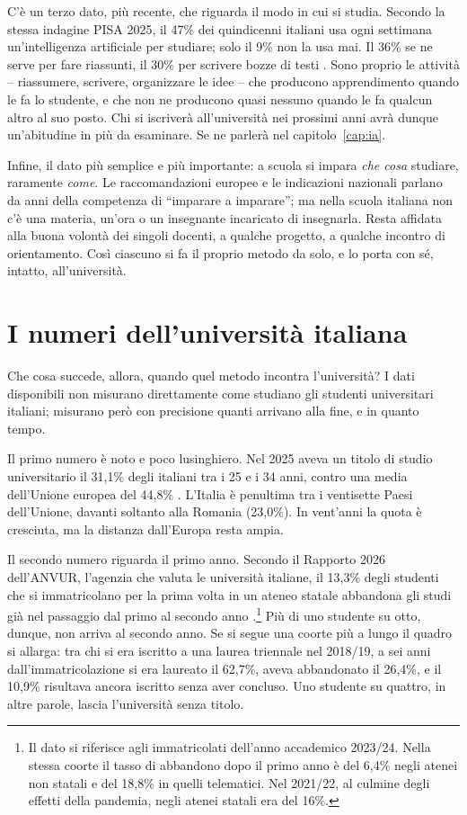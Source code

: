 C'è un terzo dato, più recente, che riguarda il modo in cui si studia.
Secondo la stessa indagine PISA 2025, il 47\% dei quindicenni italiani
usa ogni settimana un'intelligenza artificiale per studiare; solo il 9\%
non la usa mai. Il 36\% se ne serve per fare riassunti, il 30\% per
scrivere bozze di testi \parencite{oecd2026pisa}. Sono proprio le
attività -- riassumere, scrivere, organizzare le idee -- che producono
apprendimento quando le fa lo studente, e che non ne producono quasi
nessuno quando le fa qualcun altro al suo posto. Chi si iscriverà
all'università nei prossimi anni avrà dunque un'abitudine in più da
esaminare. Se ne parlerà nel capitolo~\ref{cap:ia}.

Infine, il dato più semplice e più importante: a scuola si impara
\emph{che cosa} studiare, raramente \emph{come}. Le raccomandazioni
europee e le indicazioni nazionali parlano da anni della competenza di
\enquote{imparare a imparare}; ma nella scuola italiana non c'è una
materia, un'ora o un insegnante incaricato di insegnarla. Resta affidata
alla buona volontà dei singoli docenti, a qualche progetto, a qualche
incontro di orientamento. Così ciascuno si fa il proprio metodo da solo,
e lo porta con sé, intatto, all'università.

\section{I numeri dell'università italiana}

Che cosa succede, allora, quando quel metodo incontra l'università?
I dati disponibili non misurano direttamente come studiano gli studenti
universitari italiani; misurano però con precisione quanti arrivano alla
fine, e in quanto tempo.

Il primo numero è noto e poco lusinghiero. Nel 2025 aveva un titolo
di studio universitario il 31,1\% degli italiani tra i 25 e i 34 anni,
contro una media dell'Unione europea del 44,8\%
\parencite{eurostat2026}. L'Italia è penultima tra i ventisette Paesi
dell'Unione, davanti soltanto alla Romania (23,0\%). In vent'anni la
quota è cresciuta, ma la distanza dall'Europa resta ampia.

Il secondo numero riguarda il primo anno. Secondo il Rapporto 2026
dell'ANVUR, l'agenzia che valuta le università italiane, il 13,3\% degli
studenti che si immatricolano per la prima volta in un ateneo statale
abbandona gli studi già nel passaggio dal primo al secondo anno
\parencite{anvur2026}.\footnote{Il dato si riferisce agli immatricolati
dell'anno accademico 2023/24. Nella stessa coorte il tasso di abbandono
dopo il primo anno è del 6,4\% negli atenei non statali e del 18,8\% in
quelli telematici. Nel 2021/22, al culmine degli effetti della
pandemia, negli atenei statali era del 16\%.} Più di uno studente su
otto, dunque, non arriva al secondo anno. Se si segue una coorte più a
lungo il quadro si allarga: tra chi si era iscritto a una laurea
triennale nel 2018/19, a sei anni dall'immatricolazione si era laureato
il 62,7\%, aveva abbandonato il 26,4\%, e il 10,9\% risultava ancora
iscritto senza aver concluso. Uno studente su quattro, in altre parole,
lascia l'università senza titolo.

